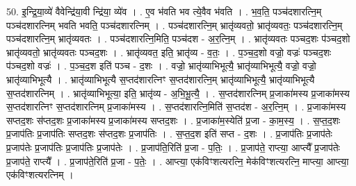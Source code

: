 \documentclass[17pt]{extarticle}
\begin{document}
50. इ॒न्द्रि॒या॒व्ये॑ वैवेन्द्रि॑या॒वी न्द्रि॑या॒ व्ये॑व । . ए॒व भ॑वति भव त्ये॒वैव भ॑वति । . भ॒व॒ति॒ पञ्च॑दशारत्नि॒म् पञ्च॑दशारत्निम् भवति भवति॒ पञ्च॑दशारत्निम् । . पञ्च॑दशारत्नि॒म् भ्रातृ॑व्यवतो॒ भ्रातृ॑व्यवतः॒ पञ्च॑दशारत्नि॒म् पञ्च॑दशारत्नि॒म् भ्रातृ॑व्यवतः । . पञ्च॑दशारत्नि॒मिति॒ पञ्च॑दश - अ॒र॒त्नि॒म् । . भ्रातृ॑व्यवतः पञ्चद॒शः प॑ञ्चद॒शो भ्रातृ॑व्यवतो॒ भ्रातृ॑व्यवतः पञ्चद॒शः । . भ्रातृ॑व्यवत॒ इति॒ भ्रातृ॑व्य - व॒तः॒ । . प॒ञ्च॒द॒शो वज्रो॒ वज्रः॑ पञ्चद॒शः प॑ञ्चद॒शो वज्रः॑ । . प॒ञ्च॒द॒श इति॑ पञ्च - द॒शः । . वज्रो॒ भ्रातृ॑व्याभिभूत्यै॒ भ्रातृ॑व्याभिभूत्यै॒ वज्रो॒ वज्रो॒ भ्रातृ॑व्याभिभूत्यै । . भ्रातृ॑व्याभिभूत्यै स॒प्तद॑शारत्निꣳ स॒प्तद॑शारत्नि॒म् भ्रातृ॑व्याभिभूत्यै॒ भ्रातृ॑व्याभिभूत्यै स॒प्तद॑शारत्निम् । . भ्रातृ॑व्याभिभूत्या॒ इति॒ भ्रातृ॑व्य - अ॒भि॒भू॒त्यै॒ । . स॒प्तद॑शारत्निम् प्र॒जाका॑मस्य प्र॒जाका॑मस्य स॒प्तद॑शारत्निꣳ स॒प्तद॑शारत्निम् प्र॒जाका॑मस्य । . स॒प्तद॑शारत्नि॒मिति॑ स॒प्तद॑श - अ॒र॒त्नि॒म् । . प्र॒जाका॑मस्य सप्तद॒शः स॑प्तद॒शः प्र॒जाका॑मस्य प्र॒जाका॑मस्य सप्तद॒शः । . प्र॒जाका॑म॒स्येति॑ प्र॒जा - का॒म॒स्य॒ । . स॒प्त॒द॒शः प्र॒जाप॑तिः प्र॒जाप॑तिः सप्तद॒शः स॑प्तद॒शः प्र॒जाप॑तिः । . स॒प्त॒द॒श इति॑ सप्त - द॒शः । . प्र॒जाप॑तिः प्र॒जाप॑तेः प्र॒जाप॑तेः प्र॒जाप॑तिः प्र॒जाप॑तिः प्र॒जाप॑तेः । . प्र॒जाप॑ति॒रिति॑ प्र॒जा - प॒तिः॒ । . प्र॒जाप॑ते॒ राप्त्या॒ आप्त्यै᳚ प्र॒जाप॑तेः प्र॒जाप॑ते॒ राप्त्यै᳚ । . प्र॒जाप॑ते॒रिति॑ प्र॒जा - प॒तेः॒ । . आप्त्या॒ एक॑विꣳशत्यरत्नि॒ मेक॑विꣳशत्यरत्नि॒ माप्त्या॒ आप्त्या॒ एक॑विꣳशत्यरत्निम् । \newline
\end{document}
